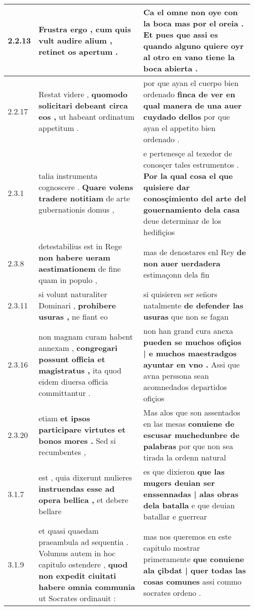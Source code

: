 \begin{tabular}{|p{1cm}|p{6.5cm}|p{6.5cm}|}
2.2.13 & Frustra ergo , \textbf{ cum quis vult audire alium , } retinet os apertum . & Ca el omne non oye con la boca mas por el oreia . \textbf{ Et pues que assi es quando alguno quiere oyr al otro } en vano tiene la boca abierta . \\\hline
2.2.17 & Restat videre , \textbf{ quomodo solicitari debeant circa eos , } ut habeant ordinatum appetitum . & por que ayan el cuerpo bien ordenado \textbf{ finca de ver en qual manera de una auer cuydado dellos } por que ayan el appetito bien ordenado . \\\hline
2.3.1 & talia instrumenta cognoscere . \textbf{ Quare volens tradere notitiam } de arte gubernationis domus , & e pertenesçe al texedor de conosçer tales estrumentos . \textbf{ Por la qual cosa el que quisiere dar conosçimiento del arte del gouernamiento dela casa } deue determinar de los hedifiçios \\\hline
2.3.8 & detestabilius est in Rege \textbf{ non habere ueram aestimationem } de fine quam in populo , & mas de denostares enl Rey \textbf{ de non auer uerdadera } estimaçonn dela fin \\\hline
2.3.11 & si volunt naturaliter Dominari , \textbf{ prohibere usuras , } ne fiant eo & si quisieren ser señors natalmente \textbf{ de defender las usuras } que non se fagan \\\hline
2.3.16 & non magnam curam habent annexam , \textbf{ congregari possunt officia et magistratus , } ita quod eidem diuersa officia committantur . & non han grand cura anexa \textbf{ pueden se muchos ofiçios | e muchos maestradgos ayuntar en vno . } Assi que avna perssona sean acomnedados departidos ofiçios \\\hline
2.3.20 & etiam \textbf{ et ipsos participare virtutes et bonos mores . } Sed si recumbentes , & Mas alos que son assentados en las mesas \textbf{ conuiene de escusar muchedunbre de palabras } por que non sea tirada la ordenn natural \\\hline
3.1.7 & est , quia dixerunt mulieres \textbf{ instruendas esse ad opera bellica , } et debere bellare & es que dixieron \textbf{ que las mugers deuian ser enssennadas | alas obras dela batalla } e que deuian batallar e guerrear \\\hline
3.1.9 & et quasi quaedam praeambula ad sequentia . Volumus autem in hoc capitulo ostendere , \textbf{ quod non expedit ciuitati habere omnia communia } ut Socrates ordinauit : & mas nos queremos en este capitulo mostrar primeramente \textbf{ que conuiene ala çibdat | quer todas las cosas comunes } assi commo socrates ordeno . \\\hline

\end{tabular}
